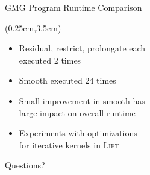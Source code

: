 \documentclass{beamer}
\newcommand{\Lift}{\textsc{Lift}\xspace}
\begin{document}
\begin{frame}{GMG Program Runtime Comparison}

	\begin{textblock*}{10cm}(0.25cm,3.5cm)
		\scriptsize
		\begin{itemize}
			\item<1-> Residual, restrict, prolongate each\\ executed 2 times
			\item<1-> Smooth executed 24 times
			\vspace{0.5cm}
			\item<3-> Small improvement in smooth has \\ large impact on overall runtime
			\item<4-> Experiments with optimizations \\ for iterative kernels in \Lift
		\end{itemize}
	\end{textblock*}
	
		
\end{frame}

\begin{frame}
\Large
\center
Questions?

\end{frame}
\end{document}
